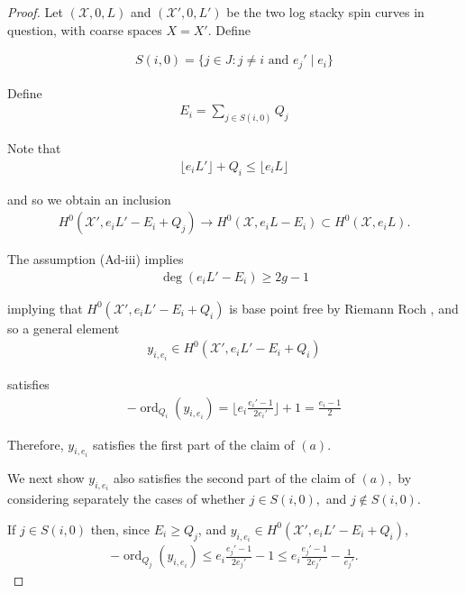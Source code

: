 \documentclass{amsart}
\theoremstyle{plain}
\theoremstyle{definition}
\theoremstyle{remark}
\numberwithin{equation}{section}
\newcommand \sx{\mathscr X}
\DeclareMathOperator{\ord}{ord}
\newcommand \subhalf[1]{\frac{{#1} - 1}{2{#1}}}
\begin{document}
\begin{proof}
Let $(\sx, 0, L)$ and $(\sx', 0, L')$ be the two log stacky spin curves in 
question, with coarse spaces $X = X'$. 
Define

\begin{align*}
	S(i,0) = \{j \in J : j \neq i \text{ and }e_j' \mid e_i\}
\end{align*}

\noindent
Define
\begin{align*}
	E_i = \sum_{j \in S(i,0)}^{}Q_j
\end{align*}

\noindent
Note that
\begin{align*}
	\lfloor e_i L' \rfloor + Q_i \leq \lfloor e_i L \rfloor 
\end{align*}

\noindent
and so we obtain an inclusion
\begin{align*}
	H^0(\sx',e_iL'-E_i + Q_j) \rightarrow H^0(\sx,e_iL - E_i) \subset 
H^0(\sx,e_iL).
\end{align*}

\noindent
The assumption (Ad-iii) implies
\begin{align*}
	\deg \left( e_i L' - E_i \right) \geq 2g-1
\end{align*}

\noindent
implying that $H^0(\sx',e_iL'-E_i + Q_i)$ is base point free by 
Riemann Roch , and so a general element
\begin{align*}
	y_{i,e_i} \in H^0(\sx',e_iL'-E_i + Q_i)
\end{align*}

\noindent
satisfies
\begin{align*}
	-\ord_{Q_i}(y_{i,e_i}) = \lfloor e_i \subhalf {e_i'} \rfloor +1 =
	\frac{e_i - 1}{2}
\end{align*}

\noindent
Therefore, $y_{i,e_i}$ satisfies the first part of the claim of $(a)$.

We next show $y_{i,e_i}$ also satisfies the second part of the
claim of $(a),$ by considering separately the cases of whether $j
\in S(i,0),$ and $j \notin S(i,0)$.

If $j \in S(i,0)$ then, since $E_i \geq Q_j$, and $y_{i,e_i} \in H^0
(\sx',e_iL'-E_i + Q_i)$,
\begin{align*}
	-\ord_{Q_j}(y_{i,e_i}) \leq e_i\subhalf {e_j'} - 1 \leq e_i 
	\subhalf{e_j'} - \frac{1}{e_j'}.
\end{align*}


\end{proof}
\end{document}
